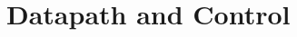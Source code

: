 \documentclass[letterpaper, 10pt]{memoir}
\begin{document}
\chapter{Datapath and Control}


%

%

%
\end{document}
